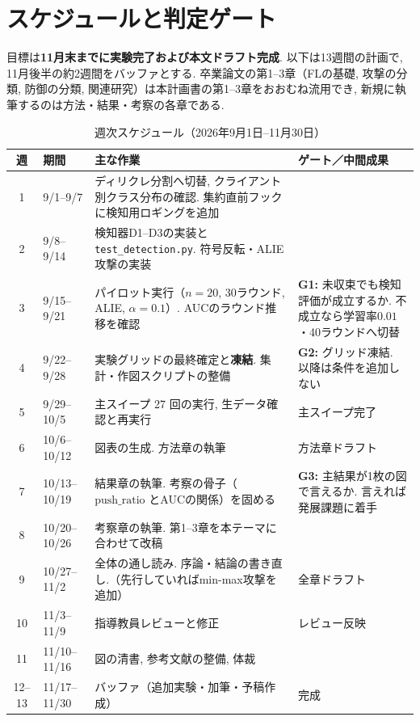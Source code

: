 \documentclass[a4j, twocolumn, dvipdfmx]{jsarticle}
\begin{document}
\section{スケジュールと判定ゲート}
\label{sec:schedule}

目標は\textbf{11月末までに実験完了および本文ドラフト完成}. 以下は13週間の計画で, 11月後半の約2週間をバッファとする. 卒業論文の第1--3章（FLの基礎, 攻撃の分類, 防御の分類, 関連研究）は本計画書の第1--3章をおおむね流用でき, 新規に執筆するのは方法・結果・考察の各章である.

\begin{table}[t]
\centering
\caption{週次スケジュール（2026年9月1日--11月30日）}
\begin{tabular}{@{}c P{2.6cm} P{8.6cm} P{4.0cm}@{}}
\toprule
週 & 期間 & 主な作業 & ゲート／中間成果 \\
 & 9/1--9/7 & ディリクレ分割へ切替, クライアント別クラス分布の確認. 集約直前フックに検知用ロギングを追加 & \\
2 & 9/8--9/14 & 検知器D1--D3の実装と \texttt{test\_detection.py}. 符号反転・ALIE攻撃の実装 & \\
3 & 9/15--9/21 & パイロット実行（$n=20$, 30ラウンド, ALIE, $\alpha=0.1$）. AUCのラウンド推移を確認 & \textbf{G1:} 未収束でも検知評価が成立するか. 不成立なら学習率$0.01$・40ラウンドへ切替 \\
4 & 9/22--9/28 & 実験グリッドの最終確定と\textbf{凍結}. 集計・作図スクリプトの整備 & \textbf{G2:} グリッド凍結. 以降は条件を追加しない \\
5 & 9/29--10/5 & 主スイープ 27 回の実行, 生データ確認と再実行 & 主スイープ完了 \\
6 & 10/6--10/12 & 図表の生成. 方法章の執筆 & 方法章ドラフト \\
7 & 10/13--10/19 & 結果章の執筆. 考察の骨子（$\mathrm{push\_ratio}$ とAUCの関係）を固める & \textbf{G3:} 主結果が1枚の図で言えるか. 言えれば発展課題に着手 \\
8 & 10/20--10/26 & 考察章の執筆. 第1--3章を本テーマに合わせて改稿 & \\
9 & 10/27--11/2 & 全体の通し読み. 序論・結論の書き直し.（先行していればmin-max攻撃を追加） & 全章ドラフト \\
10 & 11/3--11/9 & 指導教員レビューと修正 & レビュー反映 \\
11 & 11/10--11/16 & 図の清書, 参考文献の整備, 体裁 & \\
12--13 & 11/17--11/30 & バッファ（追加実験・加筆・予稿作成） & 完成 \\
\bottomrule
\end{tabular}
\end{table}
\end{document}
